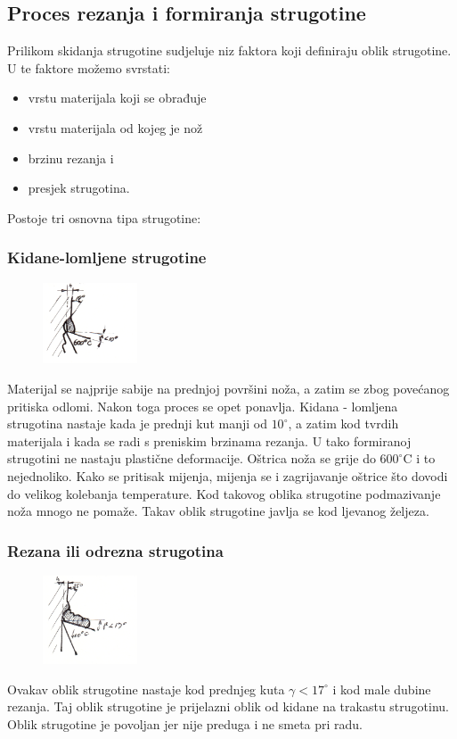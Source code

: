 \documentclass[a4paper,12pt]{article}
\numberwithin{figure}{section}
\begin{document}
\subsection{Proces rezanja i formiranja strugotine}
Prilikom skidanja strugotine sudjeluje niz faktora koji definiraju oblik strugotine. U te faktore možemo svrstati:
\begin{itemize}
\item vrstu materijala koji se obrađuje
\item vrstu materijala od kojeg je nož
\item brzinu rezanja i 
\item presjek strugotina.
\end{itemize}
Postoje tri osnovna tipa strugotine:
\subsubsection*{Kidane-lomljene strugotine}
\begin{figure}
\centering
\includegraphics[width=0.25\textwidth]{image_05-1.png}
\end{figure}
\FloatBarrier
Materijal se najprije sabije na prednjoj površini noža, a zatim se zbog povećanog pritiska odlomi. Nakon toga proces se opet ponavlja.
Kidana - lomljena strugotina nastaje kada je prednji kut manji od $10^{\circ}$, a zatim kod tvrdih materijala i kada se radi s preniskim brzinama rezanja. U tako formiranoj strugotini ne nastaju plastične deformacije. Oštrica noža se grije do $600^{\circ}$C i to nejednoliko. Kako se pritisak mijenja, mijenja se i zagrijavanje oštrice što dovodi do velikog kolebanja temperature. Kod takovog oblika strugotine podmazivanje noža mnogo ne pomaže. Takav oblik strugotine javlja se kod ljevanog željeza.
\subsubsection*{Rezana ili odrezna strugotina}
\begin{figure}
\centering
\vspace{-0.5cm}
\includegraphics[width=0.25\textwidth]{image_05-2.png}
\vspace{-3cm}
\end{figure}
\FloatBarrier
Ovakav oblik strugotine nastaje kod prednjeg kuta $\gamma < 17^{\circ}$ i kod male dubine rezanja. Taj oblik strugotine je prijelazni oblik od kidane na trakastu strugotinu. Oblik strugotine je povoljan jer nije preduga i ne smeta pri radu. 
\end{document}
